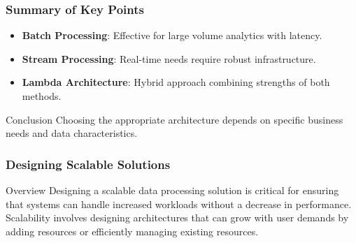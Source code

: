 \documentclass[aspectratio=169]{beamer}
\begin{document}
\begin{frame}[fragile]
    \frametitle{Summary of Key Points}
    \begin{itemize}
        \item \textbf{Batch Processing}: Effective for large volume analytics with latency.
        \item \textbf{Stream Processing}: Real-time needs require robust infrastructure.
        \item \textbf{Lambda Architecture}: Hybrid approach combining strengths of both methods.
    \end{itemize}
    
    \begin{block}{Conclusion}
        Choosing the appropriate architecture depends on specific business needs and data characteristics.
    \end{block}
\end{frame}

\begin{frame}[fragile]
    \frametitle{Designing Scalable Solutions}
    \begin{block}{Overview}
        Designing a scalable data processing solution is critical for ensuring that systems can handle increased workloads without a decrease in performance. Scalability involves designing architectures that can grow with user demands by adding resources or efficiently managing existing resources.
    \end{block}
\end{frame}
\end{document}
